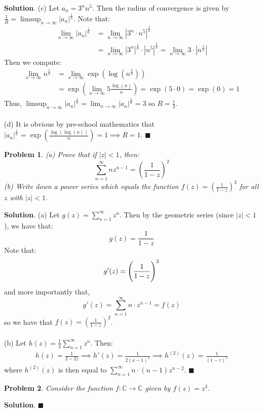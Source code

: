 \documentclass[12pt]{article}
\renewcommand{\=}[1]{\stackrel{#1}{=}} %
\newtheorem{p}{Problem}[section]
\theoremstyle{definition}
\newenvironment{s}{%
        \begin{trivlist} \item \textbf{Solution}. }{%
            \hspace*{\fill} $\blacksquare$\end{trivlist}}%
\begin{document}
\begin{s}
    (c) Let $a_n = 3^nn^5$. Then the radius of convergence is given by $\frac{1}{R} = \limsup_{n\to\infty} |a_n|^{\frac{1}{n}}$.
    Note that:
    \begin{align*}
        \lim_{n\to\infty}|a_n|^{\frac{1}{n}} &= \lim_{n\to\infty} |3^n\cdot n^5|^{\frac{1}{n}} \\
        &= \lim_{n\to\infty}|3^n|^{\frac{1}{n}}\cdot |n^5|^{\frac{1}{n}} = \lim_{n\to\infty} 3\cdot |n^\frac{5}{n}|
    \end{align*}
    Then we compute:
    \begin{align*}
        \lim_{x\to\infty} n^{\frac{5}{n}} &= \lim_{x\to\infty} \exp(\log(n^{\frac{5}{n}})) \\
        &= \exp(\lim_{n\to\infty}5\frac{\log(n)}{n}) = \exp(5\cdot0) = \exp(0) = 1
    \end{align*}
    Thus, $\limsup_{n\to\infty} |a_n|^{\frac{1}{n}} = \lim_{n\to\infty} |a_n|^{\frac{1}{n}} = 3$ so $R = \frac{1}{3}$. \\ \\

    (d) It is obvious by pre-school mathematics that $ |a_n|^{\frac{1}{n}} = \exp(\frac{\log(\log(n))}{n}) = 1 \implies R = 1$.
\end{s}

\begin{p}
    (a) Prove that if $|z| < 1$, then:
    \[ \sum_{n=1}^{\infty} nz^{n-1} = (\frac{1}{1-z})^2 \]
    (b) Write down a power series which equals the function $f(z) = (\frac{1}{1-z})^3$ for all
    $z$ with $|z| < 1$.
\end{p}
\begin{s}
    (a) Let $g(z) = \sum_{n=1}^{\infty} z^n$. Then by the geometric series (since $|z| < 1$), we have that:
    \[ g(z) = \frac{1}{1-z} \]
    Note that: 
    \[ g'(z) = \Bigg{(}\frac{1}{1-z}\Bigg{)}^2  \]
    and more importantly that,
    \[ g'(z) = \sum_{n=1}^{\infty} n\cdot z^{n-1} = f(z) \] 
    so we have that $f(z) = (\frac{1}{1-z})^2$. \\ \\

    (b) Let $h(z) = \frac{1}{2} \sum_{n=1}^{\infty} z^n$. Then:
    \begin{align*}
        h(z) = \frac{1}{2-2z} \implies h'(z) = \frac{1}{2(x-1)^2} \implies h^{(2)}(z) = \frac{1}{(1-z)^3}
    \end{align*}
    where $h^{(2)}(z)$ is then equal to $\sum_{n=1}^{\infty} n\cdot(n-1)z^{n-2}$.
\end{s}

\begin{p}
    Consider the function $f: \mathbb{C} \to \mathbb{C}$ given by $f(z) = z^3$.
\end{p}
\begin{s}
\end{s}
\end{document}
